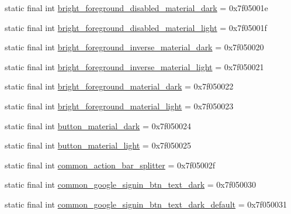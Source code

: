 \begin{DoxyCompactItemize}
\item 
static final int \mbox{\hyperlink{classcom_1_1google_1_1android_1_1gms_1_1R_1_1color_a471578d841cbe83e69c03df89e2f0d3e}{bright\+\_\+foreground\+\_\+disabled\+\_\+material\+\_\+dark}} = 0x7f05001e
\item 
static final int \mbox{\hyperlink{classcom_1_1google_1_1android_1_1gms_1_1R_1_1color_adeee483cf968e21cbd2f92929d2a53d1}{bright\+\_\+foreground\+\_\+disabled\+\_\+material\+\_\+light}} = 0x7f05001f
\item 
static final int \mbox{\hyperlink{classcom_1_1google_1_1android_1_1gms_1_1R_1_1color_ae71ca3a6dc8e36725802612a9cdf1410}{bright\+\_\+foreground\+\_\+inverse\+\_\+material\+\_\+dark}} = 0x7f050020
\item 
static final int \mbox{\hyperlink{classcom_1_1google_1_1android_1_1gms_1_1R_1_1color_a7b541eff91fb00652faffa16a43e9bbb}{bright\+\_\+foreground\+\_\+inverse\+\_\+material\+\_\+light}} = 0x7f050021
\item 
static final int \mbox{\hyperlink{classcom_1_1google_1_1android_1_1gms_1_1R_1_1color_aaa5b3949d906b8394bddd336e7f544ba}{bright\+\_\+foreground\+\_\+material\+\_\+dark}} = 0x7f050022
\item 
static final int \mbox{\hyperlink{classcom_1_1google_1_1android_1_1gms_1_1R_1_1color_aa656612975ad48da7f8057d4edfc440c}{bright\+\_\+foreground\+\_\+material\+\_\+light}} = 0x7f050023
\item 
static final int \mbox{\hyperlink{classcom_1_1google_1_1android_1_1gms_1_1R_1_1color_a69313c1630f1b1edca6699c15459b826}{button\+\_\+material\+\_\+dark}} = 0x7f050024
\item 
static final int \mbox{\hyperlink{classcom_1_1google_1_1android_1_1gms_1_1R_1_1color_a635d9a81e31e76ef00a4918d4823e6db}{button\+\_\+material\+\_\+light}} = 0x7f050025
\item 
static final int \mbox{\hyperlink{classcom_1_1google_1_1android_1_1gms_1_1R_1_1color_ab971e241ec090717e9262ec610132c21}{common\+\_\+action\+\_\+bar\+\_\+splitter}} = 0x7f05002f
\item 
static final int \mbox{\hyperlink{classcom_1_1google_1_1android_1_1gms_1_1R_1_1color_a50faf2e2ba7e51a94c2fecc0627dcd69}{common\+\_\+google\+\_\+signin\+\_\+btn\+\_\+text\+\_\+dark}} = 0x7f050030
\item 
static final int \mbox{\hyperlink{classcom_1_1google_1_1android_1_1gms_1_1R_1_1color_a7d6bc5fec68e57843e15ee531addd4b5}{common\+\_\+google\+\_\+signin\+\_\+btn\+\_\+text\+\_\+dark\+\_\+default}} = 0x7f050031
\item 

\end{DoxyCompactItemize}
